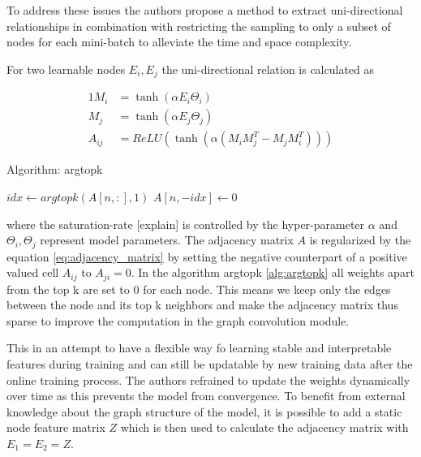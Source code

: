 \documentclass[letterpaper,twocolumn,12pt]{article}
\begin{document}
    To address these issues the authors propose a method to extract uni-directional relationships in combination with restricting the sampling
    to only a subset of nodes for each mini-batch to alleviate the time and space complexity.

    For two learnable nodes $E_i, E_j$ the uni-directional relation is calculated as

    \begin{alignat}{1}
        M_i &= \tanh (\alpha E_i \Theta_i) \\
        M_j &= \tanh (\alpha E_j \Theta_j)  \\
        A_{ij} &= ReLU(\tanh (\alpha(M_i M_j^T - M_j M_i^T))) \label{eq:adjacency_matrix}
    \end{alignat}
    \begin{algorithm}
        \caption{Algorithm: argtopk}\label{alg:argtopk}
        \begin{algorithmic}[1]
                \State $idx \gets argtopk(A[n,:], 1)$
                \State $A[n, -idx] \gets 0$
            \EndFor
        \end{algorithmic}
    \end{algorithm}
    where the saturation-rate [explain] is controlled by the hyper-parameter $\alpha$ and  $\Theta_i, \Theta_j$ represent
    model parameters. The adjacency matrix $A$ is regularized by the equation \ref{eq:adjacency_matrix}
    by setting the negative counterpart of a positive valued cell $A_{ij}$ to $A_{ji} = 0$. In the algorithm argtopk \ref{alg:argtopk}
    all weights apart from the top k are set to 0 for each node.
    This means we keep only the edges between the node and its top k neighbors and make the adjacency matrix thus sparse to improve the computation in the graph convolution module.

    This in an attempt to have a flexible way fo learning stable and interpretable features during training and can still be updatable by new training data after the online training process.
    The authors refrained to update the weights dynamically over time as this prevents the model from convergence.
    To benefit from external knowledge about the graph structure of the model, it is possible to add a static node feature matrix $Z$
    which is then used to calculate the adjacency matrix with $E_1 =  E_2 = Z $.
\end{document}
